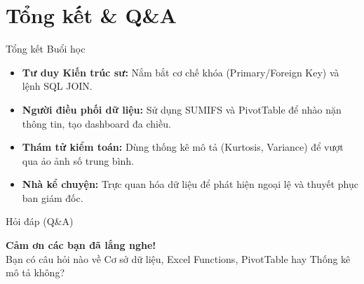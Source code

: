 \documentclass[aspectratio=169,12pt]{beamer}
\begin{document}
\section{Tổng kết \& Q\&A}

\begin{frame}{Tổng kết Buổi học}
    \begin{itemize}
        \item \textbf{Tư duy Kiến trúc sư:} Nắm bắt cơ chế khóa (Primary/Foreign Key) và lệnh SQL JOIN.
        \item \textbf{Người điều phối dữ liệu:} Sử dụng SUMIFS và PivotTable để nhào nặn thông tin, tạo dashboard đa chiều.
        \item \textbf{Thám tử kiểm toán:} Dùng thống kê mô tả (Kurtosis, Variance) để vượt qua ảo ảnh số trung bình.
        \item \textbf{Nhà kể chuyện:} Trực quan hóa dữ liệu để phát hiện ngoại lệ và thuyết phục ban giám đốc.
    \end{itemize}
\end{frame}

\begin{frame}{Hỏi đáp (Q\&A)}
    \begin{center}
        \Large \textbf{Cảm ơn các bạn đã lắng nghe!}\\
        \vspace{1cm}
        Bạn có câu hỏi nào về Cơ sở dữ liệu, Excel Functions, PivotTable hay Thống kê mô tả không?
    \end{center}
\end{frame}
\end{document}
